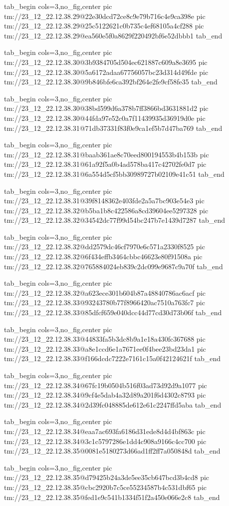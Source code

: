 \ifcmt
  tab_begin cols=3,no_fig,center
    pic tm://23_12_22.12.38.29@22e30dcd72ce8c9e79b716c4e9ca398e
    pic tm://23_12_22.12.38.29@25c5122621c0b735c4ef68105a4cf288
    pic tm://23_12_22.12.38.29@ea560e5f0a8629f220492bf6e52dbbb1
  tab_end
\fi


\ifcmt
  tab_begin cols=3,no_fig,center
    pic tm://23_12_22.12.38.30@3b9384705d504ec621887c609a8e3695
    pic tm://23_12_22.12.38.30@5a6172adaa67756057bc23d314d49fde
    pic tm://23_12_22.12.38.30@9b846bfe6ca392bf264e2fe9cf58fe35
  tab_end
\fi


\ifcmt
  tab_begin cols=3,no_fig,center
    pic tm://23_12_22.12.38.30@38bd599d6a378b7ff3866bd3631881d2
    pic tm://23_12_22.12.38.30@44fda97e52c0a7f11439935d36919d0e
    pic tm://23_12_22.12.38.31@71db37331f83f0e9ca1ef5b7d47ba769
  tab_end
\fi


\ifcmt
  tab_begin cols=3,no_fig,center
    pic tm://23_12_22.12.38.31@baab361ae8c70eed800194553b4b153b
    pic tm://23_12_22.12.38.31@61a92f5a0b4ad578ba417c42702fe0d7
    pic tm://23_12_22.12.38.31@6a554d5cf5bb30989727b02109e41c51
  tab_end
\fi


\ifcmt
  tab_begin cols=3,no_fig,center
    pic tm://23_12_22.12.38.31@39f8148362e403fde2a5a7bc903e54e3
    pic tm://23_12_22.12.38.32@b5ba1b8c422586a8cd39604ee5297328
    pic tm://23_12_22.12.38.32@34542dc77f99d54bc247b7e1439d7287
  tab_end
\fi


\ifcmt
  tab_begin cols=3,no_fig,center
    pic tm://23_12_22.12.38.32@dd2579dc46cf7970e6c571a2330f8525
    pic tm://23_12_22.12.38.32@6f434effb3464cbbc46623e80f91508a
    pic tm://23_12_22.12.38.32@765884024eb839c2dc099e9687c9a70f
  tab_end
\fi


\ifcmt
  tab_begin cols=3,no_fig,center
    pic tm://23_12_22.12.38.32@a623ece301b604b87a48840786ac6acf
    pic tm://23_12_22.12.38.33@93243780b77f8966420ac7510a763fc7
    pic tm://23_12_22.12.38.33@85dfcf659e040dcc44d77cd30d73b06f
  tab_end
\fi


\ifcmt
  tab_begin cols=3,no_fig,center
    pic tm://23_12_22.12.38.33@44833fa5b3dc8b9a1e18a430fc367688
    pic tm://23_12_22.12.38.33@a8e1ccd6e1a7671ee0f4bee23bd23da1
    pic tm://23_12_22.12.38.33@f166dcdc7222e7161c15a0f42124621f
  tab_end
\fi


\ifcmt
  tab_begin cols=3,no_fig,center
    pic tm://23_12_22.12.38.34@67fc19b0504b516f03ad73d92d9a1077
    pic tm://23_12_22.12.38.34@9cf4e5dab4a32d89a201f6d4302c8793
    pic tm://23_12_22.12.38.34@2d39fc048885de612e61c2247ffd5aba
  tab_end
\fi


\ifcmt
  tab_begin cols=3,no_fig,center
    pic tm://23_12_22.12.38.34@eaa7ac693fa6186d31ede8d4d4bf863c
    pic tm://23_12_22.12.38.34@3c1c5797286e1dd4c908a9166c4cc700
    pic tm://23_12_22.12.38.35@0081e5180273d66ad1ff2ff7a050848d
  tab_end
\fi


\ifcmt
  tab_begin cols=3,no_fig,center
    pic tm://23_12_22.12.38.35@d79425b24a3de5ee35cb647bcd3b4cd8
    pic tm://23_12_22.12.38.35@cbc2920b7c5ce55234587b4c531dbf65
    pic tm://23_12_22.12.38.35@fed1e9c541b1334f51f2a450e066e2c8
  tab_end
\fi

